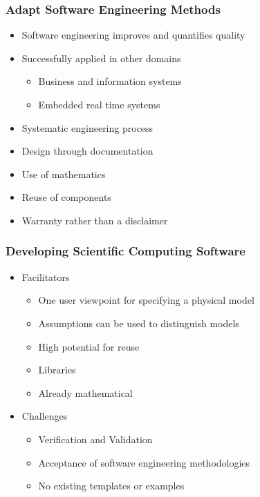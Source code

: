 \documentclass[t,12pt,numbers,fleqn]{beamer}
\begin{document}

\begin{frame}

\frametitle{Adapt Software Engineering Methods}

\begin{itemize}

\item Software engineering improves and quantifies quality %
\item Successfully applied in other domains
\begin{itemize}
\item Business and information systems
\item Embedded real time systems
\end{itemize}
\item Systematic engineering process
\item Design through documentation
\item Use of mathematics
\item Reuse of components
\item Warranty rather than a disclaimer %

\end{itemize}

\end{frame}


\begin{frame}

\frametitle{Developing Scientific Computing Software}

\begin{itemize}

\item Facilitators
\begin{itemize}
\item One user viewpoint for specifying a physical model
\item Assumptions can be used to distinguish models
\item High potential for reuse
\item Libraries
\item Already mathematical
\end{itemize}

\item Challenges
\begin{itemize}
\item Verification and Validation
\item Acceptance of software engineering methodologies
\item No existing templates or examples %
\end{itemize}

\end{itemize}

\end{frame}
\end{document}
